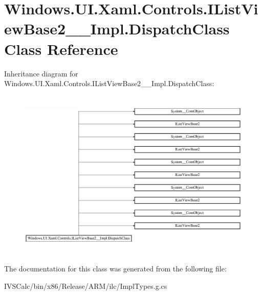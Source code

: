 \hypertarget{class_windows_1_1_u_i_1_1_xaml_1_1_controls_1_1_i_list_view_base2_____impl_1_1_dispatch_class}{}\section{Windows.\+U\+I.\+Xaml.\+Controls.\+I\+List\+View\+Base2\+\_\+\+\_\+\+Impl.\+Dispatch\+Class Class Reference}
\label{class_windows_1_1_u_i_1_1_xaml_1_1_controls_1_1_i_list_view_base2_____impl_1_1_dispatch_class}
Inheritance diagram for Windows.\+U\+I.\+Xaml.\+Controls.\+I\+List\+View\+Base2\+\_\+\+\_\+\+Impl.\+Dispatch\+Class\+:\begin{figure}[H]
\begin{center}
\leavevmode
\includegraphics[height=8.169762cm]{class_windows_1_1_u_i_1_1_xaml_1_1_controls_1_1_i_list_view_base2_____impl_1_1_dispatch_class}
\end{center}
\end{figure}


The documentation for this class was generated from the following file\+:\begin{DoxyCompactItemize}
\item 
I\+V\+S\+Calc/bin/x86/\+Release/\+A\+R\+M/ilc/Impl\+Types.\+g.\+cs\end{DoxyCompactItemize}
